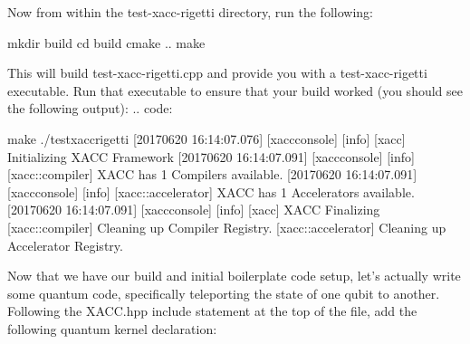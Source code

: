 \documentclass[letterpaper,10pt,english]{sphinxmanual}
\begin{document}
Now from within the test-xacc-rigetti directory, run the following:

\begin{sphinxVerbatim}[commandchars=\\\{\}]
\PYGZdl{} mkdir build
\PYGZdl{} cd build
\PYGZdl{} cmake ..
\PYGZdl{} make
\end{sphinxVerbatim}

This will build test-xacc-rigetti.cpp and provide you with a test-xacc-rigetti executable. Run that
executable to ensure that your build worked (you should see the following output):
.. code:

\begin{sphinxVerbatim}[commandchars=\\\{\}]
\PYGZdl{} make
\PYGZdl{} ./test\PYGZhy{}xacc\PYGZhy{}rigetti
[2017\PYGZhy{}06\PYGZhy{}20 16:14:07.076] [xacc\PYGZhy{}console] [info] [xacc] Initializing XACC Framework
[2017\PYGZhy{}06\PYGZhy{}20 16:14:07.091] [xacc\PYGZhy{}console] [info] [xacc::compiler] XACC has 1 Compilers available.
[2017\PYGZhy{}06\PYGZhy{}20 16:14:07.091] [xacc\PYGZhy{}console] [info] [xacc::accelerator] XACC has 1 Accelerators available.
[2017\PYGZhy{}06\PYGZhy{}20 16:14:07.091] [xacc\PYGZhy{}console] [info]
[xacc] XACC Finalizing
[xacc::compiler] Cleaning up Compiler Registry.
[xacc::accelerator] Cleaning up Accelerator Registry.
\end{sphinxVerbatim}

Now that we have our build and initial boilerplate code setup, let’s actually write some quantum code, specifically
teleporting the state of one qubit to another. Following the XACC.hpp include statement at the top of the file,
add the following quantum kernel declaration:
\end{document}
